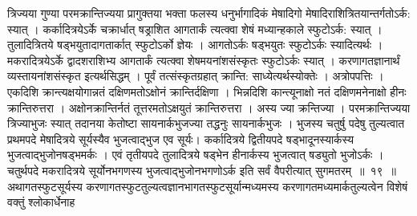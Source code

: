 \documentclass[11pt, openany]{book}
\begin{document}
\begin{sloppypar}
\noindent त्रिज्यया गुण्या परमक्रान्तिज्यया प्रागुक्तया भक्ता फलस्य धनुर्भागादिकं मेषादिगो मेषादिराशित्रितयान्तर्गतोऽर्क: स्यात् । कर्कादित्रयेऽर्के चक्रार्धात् षड्राशित आगतार्कं त्यत्क्वा शेषं मध्यान्हकाले स्फुटोऽर्क: स्यात् । तुलादित्रितये षड्भयुतादागतार्कात् स्फुटोऽर्को ज्ञेयः । आगतोऽर्कः षड्भयुतः स्फुटोऽर्कः स्यादित्यर्थः । मकरादित्रयेऽर्के द्वादशराशिभ्य आगतार्कं त्यत्क्वा शेषमयनांशसंस्कृतः स्फुटोऽर्कः स्यात् । करणागतज्ञानार्थं व्यस्तायनांशसंस्कृत इत्यर्थसिद्धम् । पूर्वं तत्संस्कृतग्रहात् क्रान्ति: साध्येत्यर्थस्योक्तेः । अत्रोपपत्तिः । एकदिशि क्रान्त्यक्षयोगान्नतं दक्षिणमतोऽक्षोनं क्रान्तिर्दक्षिणा । भिन्नदिशि कान्त्यूनाक्षो नतं दक्षिणमनेनाक्षो हीनः क्रान्तिरुत्तरा । अक्षोनक्रान्तिर्नतं तूत्तरमतोऽक्षयुतं क्रान्तिरुत्तरा । अस्य ज्या क्रन्तिज्या । परमक्रान्तिज्यया त्रिज्याभुजः स्यात् तदानया केतोष्टा सायनार्कभुजज्या तद्धनुः सायनार्कभुजः । भुजस्य चतुर्षु पदेषु तुल्यत्वात प्रथमपदे मेषादित्रये सूर्यस्यैव भुजत्वाद्भुज एव सूर्यः। कर्कादित्रये  द्वितीयपदे षड्भादूनस्यार्कस्य भुजत्वाद्भुजोनषड्भमर्कः । एवं तृतीयपदे तुलादित्रये षड्भेन हीनार्कस्य भुजत्वात् षड्युतो भुजोऽर्कः । चतुर्थपदे मकरादित्रये सूर्योनभगणस्य भुजत्वाद्भुजोनभगणोऽर्क इति सर्वं वैपरीत्यात् सुगमतरम्~॥~१९~॥\\
\noindent अथागतस्फुटसूर्यस्य करणागतस्फुटतुल्यत्वज्ञानभागतस्फुटसूर्यान्मध्यमस्य करणागतमध्यमार्कतुल्यत्वेन विशेषं वक्तुं श्लोकार्धेनाह\textendash
\end{sloppypar}

\newpage
\end{document}
